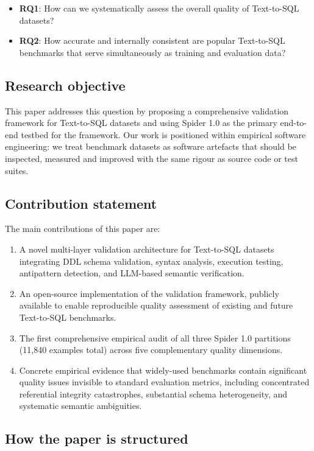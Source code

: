 \documentclass[]{einformatica}
\begin{document}
\begin{itemize}
\item \textbf{RQ1}: How can we systematically assess the overall quality of Text-to-SQL datasets?
\item \textbf{RQ2}: How accurate and internally consistent are popular Text-to-SQL benchmarks that serve simultaneously as training and evaluation data?
\end{itemize}

\subsection*{Research objective}

This paper addresses this question by proposing a comprehensive validation framework for Text-to-SQL datasets and using Spider 1.0 as the primary end-to-end testbed for the framework. Our work is positioned within empirical software engineering: we treat benchmark datasets as software artefacts that should be inspected, measured and improved with the same rigour as source code or test suites.

\subsection*{Contribution statement}

The main contributions of this paper are:

\begin{enumerate}
\item A novel multi-layer validation architecture for Text-to-SQL datasets integrating DDL schema validation, syntax analysis, execution testing, antipattern detection, and LLM-based semantic verification.
\item An open-source implementation of the validation framework, publicly available to enable reproducible quality assessment of existing and future Text-to-SQL benchmarks.
\item The first comprehensive empirical audit of all three Spider 1.0 partitions (11,840 examples total) across five complementary quality dimensions.
\item Concrete empirical evidence that widely-used benchmarks contain significant quality issues invisible to standard evaluation metrics, including concentrated referential integrity catastrophes, substantial schema heterogeneity, and systematic semantic ambiguities.
\end{enumerate}

\subsection*{How the paper is structured}
\end{document}
